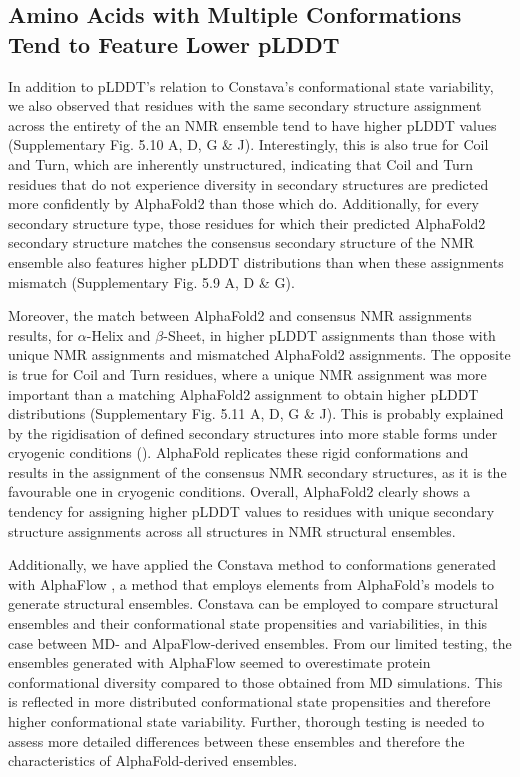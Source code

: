 \subsection{Amino Acids with Multiple Conformations Tend to Feature Lower pLDDT}

In addition to pLDDT's relation to Constava's conformational state variability, we also observed that residues with the same secondary structure assignment across the entirety of the an NMR ensemble tend to have higher pLDDT values (Supplementary Fig. 5.10 A, D, G \& J). 
Interestingly, this is also true for Coil and Turn, which are inherently unstructured, indicating that Coil and Turn residues that do not experience diversity in secondary structures are predicted more confidently by AlphaFold2 than those which do. Additionally, for every secondary structure type, those residues for which their predicted AlphaFold2 secondary structure matches the consensus secondary structure of the NMR ensemble also features higher pLDDT distributions than when these assignments mismatch (Supplementary Fig. 5.9 A, D \& G). 

Moreover, the match between AlphaFold2 and consensus NMR assignments results, for $\alpha$-Helix and $\beta$-Sheet, in higher pLDDT assignments than those with unique NMR assignments and mismatched AlphaFold2 assignments. The opposite is true for Coil and Turn residues, where a unique NMR assignment was more important than a matching AlphaFold2 assignment to obtain higher pLDDT distributions (Supplementary Fig. 5.11 A, D, G \& J).
This is probably explained by the rigidisation of defined secondary structures into more stable forms under cryogenic conditions (). AlphaFold replicates these rigid conformations and results in the assignment of the consensus NMR secondary structures, as it is the favourable one in cryogenic conditions. Overall, AlphaFold2 clearly shows a tendency for assigning higher pLDDT values to residues with unique secondary structure assignments across all structures in NMR structural ensembles.

Additionally, we have applied the Constava method to conformations generated with AlphaFlow \cite{jing_alphafold_2024}, a method that employs elements from AlphaFold's models to generate structural ensembles. Constava can be employed to compare structural ensembles and their conformational state propensities and variabilities, in this case between MD- and AlpaFlow-derived ensembles. From our limited testing, the ensembles generated with AlphaFlow seemed to overestimate protein conformational diversity compared to those obtained from MD simulations. This is reflected in more distributed conformational state propensities and therefore higher conformational state variability. Further, thorough testing is needed to assess more detailed differences between these ensembles and therefore the characteristics of AlphaFold-derived ensembles.


